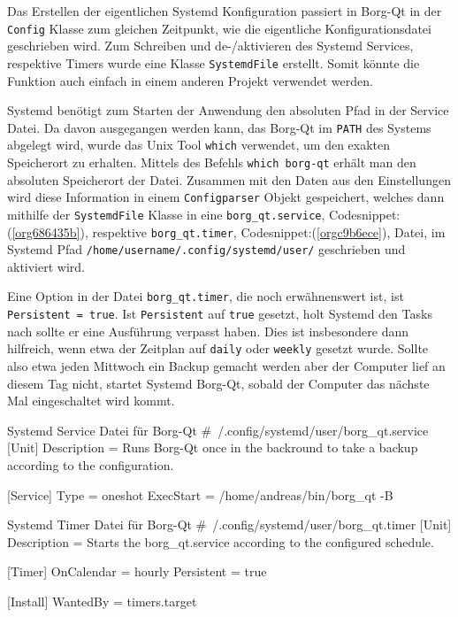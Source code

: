 Das Erstellen der eigentlichen Systemd Konfiguration passiert in Borg-Qt in der
\texttt{Config} Klasse zum gleichen Zeitpunkt, wie die eigentliche Konfigurationsdatei
geschrieben wird. Zum Schreiben und de-/aktivieren des Systemd Services,
respektive Timers wurde eine Klasse \texttt{SystemdFile} erstellt. Somit könnte
die Funktion auch einfach in einem anderen Projekt verwendet werden.

Systemd benötigt zum Starten der Anwendung den absoluten Pfad in der Service
Datei. Da davon ausgegangen werden kann, das Borg-Qt im \texttt{PATH} des Systems
abgelegt wird, wurde das Unix Tool \texttt{which} verwendet, um den exakten Speicherort
zu erhalten. Mittels des Befehls \texttt{which borg-qt} erhält man den absoluten
Speicherort der Datei. Zusammen mit den Daten aus den Einstellungen wird diese
Information in einem \texttt{Configparser} Objekt gespeichert, welches dann mithilfe
der \texttt{SystemdFile} Klasse in eine \texttt{borg\_qt.service},
Codesnippet:(\ref{org686435b}), respektive \texttt{borg\_qt.timer},
Codesnippet:(\ref{orgc9b6ece}), Datei, im Systemd Pfad
\texttt{/home/username/.config/systemd/user/} geschrieben und aktiviert wird.

Eine Option in der Datei \texttt{borg\_qt.timer}, die noch erwähnenswert ist, ist
\texttt{Persistent = true}. Ist \texttt{Persistent} auf \texttt{true} gesetzt, holt Systemd den
Tasks nach sollte er eine Ausführung verpasst haben. Dies ist insbesondere dann
hilfreich, wenn etwa der Zeitplan auf \texttt{daily} oder \texttt{weekly} gesetzt wurde.
Sollte also etwa jeden Mittwoch ein Backup gemacht werden aber der Computer
lief an diesem Tag nicht, startet Systemd Borg-Qt, sobald der Computer das
nächste Mal eingeschaltet wird kommt.

\begin{sexylisting}{Systemd Service Datei für Borg-Qt}
#~/.config/systemd/user/borg_qt.service
[Unit]
Description = Runs Borg-Qt once in the backround to take a backup according to the configuration.

[Service]
Type = oneshot
ExecStart = /home/andreas/bin/borg_qt -B
\end{sexylisting}

\begin{sexylisting}{Systemd Timer Datei für Borg-Qt}
#~/.config/systemd/user/borg_qt.timer
[Unit]
Description = Starts the borg_qt.service according to the configured schedule.

[Timer]
OnCalendar = hourly
Persistent = true

[Install]
WantedBy = timers.target
\end{sexylisting}

